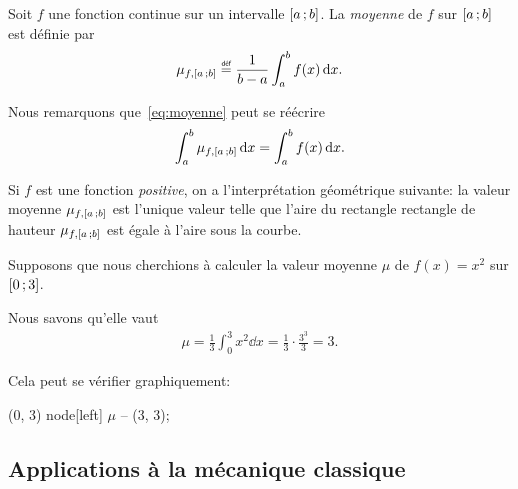\documentclass[main.tex]{subfiles}
\begin{document}
\begin{definition}

    Soit $f$ une fonction continue sur un intervalle $\mathopen{[}a\,;b\mathclose{]}$.
    La \emph{moyenne} de $f$ sur $\mathopen{[}a\,;b\mathclose{]}$ est définie par
    \begin{align}
        \mu_{f, \ccinterval a b} \defeq \frac 1 {b - a} \int_a^b f(x) \dd x.
        \label{eq:moyenne}
    \end{align}
\end{definition}

\begin{remark}
    Nous remarquons que~\eqref{eq:moyenne} peut se réécrire
    \begin{align*}
        \int_a^b \mu_{f, \mathopen{[}a\,;b\mathclose{]}} \,\mathrm{d} x = \int_a^b f(x) \,\mathrm{d} x.
    \end{align*}

    Si $f$ est une fonction \emph{positive},
    on a l'interprétation géométrique suivante:
    la valeur moyenne $\mu_{f, \mathopen{[}a\,;b\mathclose{]}}$ est l'unique valeur telle que
    l'aire du rectangle rectangle de hauteur $\mu_{f, \mathopen{[}a\,;b\mathclose{]}}$
    est égale à l'aire sous la courbe.
    \begin{plot}{0.5}{-1}{-1}{4}{4}
    \end{plot}
\end{remark}

\begin{example}

    Supposons que nous cherchions à calculer la valeur moyenne $\mu$ de $f(x) = x^2$ sur $\mathopen{[}0\,;3\mathclose{]}$.

    Nous savons qu'elle vaut
    \begin{align}
        \mu = \frac 1 3 \int_0^3 x^2 \dd x = \frac 1 3 \cdot \frac {3^3} 3 = 3.
    \end{align}

    Cela peut se vérifier graphiquement:
    \begin{plot}{0.5}{-1}{-1}{4}{10}
        \drawline (0, 3) node[left] {\footnotesize{$\mu$}} -- (3, 3);
    \end{plot}
\end{example}

\subsection{Applications à la mécanique classique}
\end{document}
